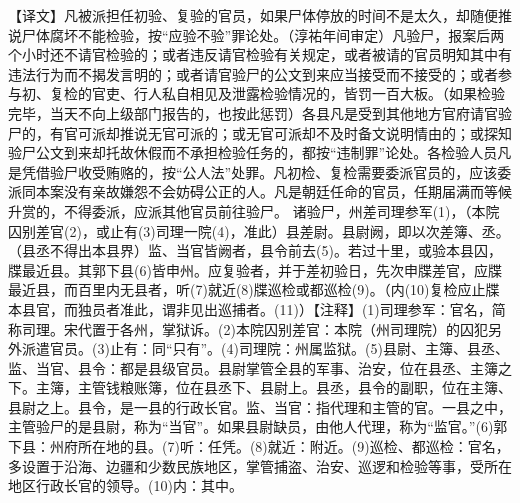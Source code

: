 \documentclass[12pt,UTF8]{ctexbook}
\begin{document}
【译文】凡被派担任初验、复验的官员，如果尸体停放的时间不是太久，却随便推说尸体腐坏不能检验，按“应验不验”罪论处。（淳祐年间审定）凡验尸，报案后两个小时还不请官检验的；或者违反请官检验有关规定，或者被请的官员明知其中有违法行为而不揭发言明的；或者请官验尸的公文到来应当接受而不接受的；或者参与初、复检的官吏、行人私自相见及泄露检验情况的，皆罚一百大板。（如果检验完毕，当天不向上级部门报告的，也按此惩罚）各县凡是受到其他地方官府请官验尸的，有官可派却推说无官可派的；或无官可派却不及时备文说明情由的；或探知验尸公文到来却托故休假而不承担检验任务的，都按“违制罪”论处。各检验人员凡是凭借验尸收受贿赂的，按“公人法”处罪。凡初检、复检需要委派官员的，应该委派同本案没有亲故嫌怨不会妨碍公正的人。凡是朝廷任命的官员，任期届满而等候升赏的，不得委派，应派其他官员前往验尸。
诸验尸，州差司理参军(1)，（本院囚别差官(2)，或止有(3)司理一院(4)，准此）县差尉。县尉阙，即以次差簿、丞。（县丞不得出本县界）监、当官皆阙者，县令前去(5)。若过十里，或验本县囚，牒最近县。其郭下县(6)皆申州。应复验者，并于差初验日，先次申牒差官，应牒最近县，而百里内无县者，听(7)就近(8)牒巡检或都巡检(9)。（内(10)复检应止牒本县官，而独员者准此，谓非见出巡捕者。(11)）【注释】(1)司理参军：官名，简称司理。宋代置于各州，掌狱诉。(2)本院囚别差官：本院（州司理院）的囚犯另外派遣官员。(3)止有：同“只有”。(4)司理院：州属监狱。(5)县尉、主簿、县丞、监、当官、县令：都是县级官员。县尉掌管全县的军事、治安，位在县丞、主簿之下。主簿，主管钱粮账簿，位在县丞下、县尉上。县丞，县令的副职，位在主簿、县尉之上。县令，是一县的行政长官。监、当官：指代理和主管的官。一县之中，主管验尸的是县尉，称为“当官”。如果县尉缺员，由他人代理，称为“监官。”(6)郭下县：州府所在地的县。(7)听：任凭。(8)就近：附近。(9)巡检、都巡检：官名，多设置于沿海、边疆和少数民族地区，掌管捕盗、治安、巡逻和检验等事，受所在地区行政长官的领导。(10)内：其中。
\end{document}
